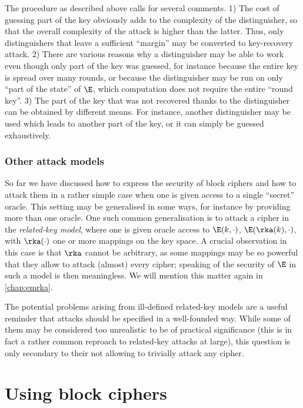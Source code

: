 The procedure as described above calls for several comments. 1) The cost of guessing part of the key obviously adds to the complexity of the distinguisher, so that the overall complexity of the attack
is higher than the latter. Thus, only distinguishers that leave a sufficient ``margin'' may be converted to key-recovery attack. 2) There are various reasons why a distinguisher may be able to work
even though only part of the key was guessed, for instance because the entire key is spread over many rounds, or because the distinguisher may be run on only ``part of the state'' of $\E$, which computation
does not require the entire ``round key''. 3) The part of the key that was not recovered thanks to the distinguisher can be obtained by different means. For instance, another distinguisher may be
used which leads to another part of the key, or it can simply be guessed exhaustively.


\subsubsection{Other attack models}

So far we have discussed how to express the security of block ciphers and how to attack them in a rather simple case when one is given access to a single ``secret'' oracle. This setting may be generalised
in some ways, for instance by providing more than one oracle. One such common generalisation is to attack a cipher in the \emph{related-key model}, where one is given oracle access to
$\E(k,\cdot)$, $\E(\rka(k),\cdot)$, with $\rka(\cdot)$ one or more mappings on the key space. A crucial observation in this case is that $\rka$ cannot be arbitrary, as some mappings may
be so powerful that they allow to attack (almost) every cipher; speaking of the security of $\E$ in such a model is then meaningless. We will mention this matter again in \autoref{chap:emrka}.

The potential problems arising from ill-defined related-key models are a useful reminder that attacks should be specified in a well-founded way. While some of them may be
considered too unrealistic to be of practical significance (this is in fact a rather common reproach to related-key attacks at large), this question is only secondary to their not allowing to trivially
attack any cipher. 

\section{Using block ciphers}
\label{sec:bc_modes}

